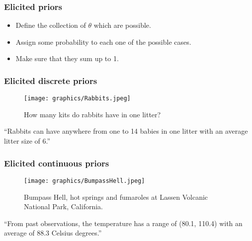 \documentclass{beamer}
\newcommand{\1}{\ensuremath{\mathbf{1}}}
\begin{document}
%
%
%
\begin{frame}\frametitle{Elicited priors}
	\begin{block}{}
		\begin{itemize}
			\item Define the collection of $\theta$ which are possible.
			\item Assign some probability to each one of the possible cases.
			\item Make sure that they sum up to 1.
		\end{itemize}
	\end{block}
\end{frame}
%
%
%
\begin{frame}\frametitle{Elicited \textbf{discrete} priors}
	\begin{figure}
	\begin{center}
		\texttt{[image: graphics/Rabbits.jpeg]}
	\end{center}
	\caption{How many kits do rabbits have in one litter?}
	\end{figure}
	\vspace{-3.5ex}\begin{block}{}
	``Rabbits can have anywhere from one to 14 babies in one litter with an average litter size of 6.''
	\end{block}
\end{frame}
%
%
%
\begin{frame}\frametitle{Elicited \textbf{continuous} priors}
	\begin{figure}
	\begin{center}
		\texttt{[image: graphics/BumpassHell.jpeg]}
	\end{center}
	\caption{Bumpass Hell, hot springs and fumaroles at Lassen Volcanic National Park, California.}
	\end{figure}
	\vspace{-2ex}\begin{block}{}
		``From past observations, the temperature has a range of (80.1, 110.4) with an average of 88.3 Celsius degrees.''
	\end{block}
\end{frame}
\end{document}
